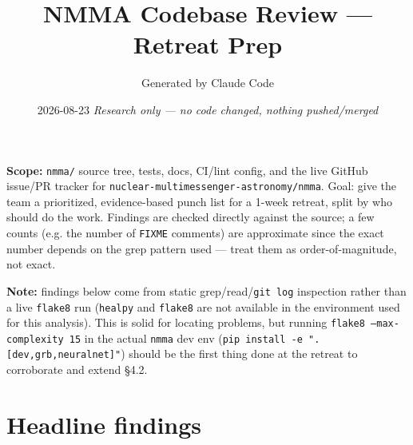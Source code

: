 \documentclass[10pt]{article}
\title{\vspace{-2em}NMMA Codebase Review --- Retreat Prep}
\author{Generated by Claude Code}
\date{2026-08-23 \quad \textit{Research only --- no code changed, nothing pushed/merged}}
\newcommand{\code}[1]{\texttt{#1}}
\begin{document}
\maketitle
\thispagestyle{fancy}

\noindent
\textbf{Scope:} \code{nmma/} source tree, tests, docs, CI/lint config, and the live
GitHub issue/PR tracker for \code{nuclear-multimessenger-astronomy/nmma}. Goal: give
the team a prioritized, evidence-based punch list for a 1-week retreat, split by who
should do the work. Findings are checked directly against the source; a few counts
(e.g. the number of \code{FIXME} comments) are approximate since the exact number
depends on the grep pattern used --- treat them as order-of-magnitude, not exact.

\textbf{Note:} findings below come from static grep/read/\code{git log} inspection
rather than a live \code{flake8} run (\code{healpy} and \code{flake8} are not
available in the environment used for this analysis). This is solid for locating
problems, but running \code{flake8 --max-complexity 15} in the actual \code{nmma}
dev env (\code{pip install -e ".[dev,grb,neuralnet]"}) should be the first thing
done at the retreat to corroborate and extend \S4.2.

\section{Headline findings}
\end{document}
